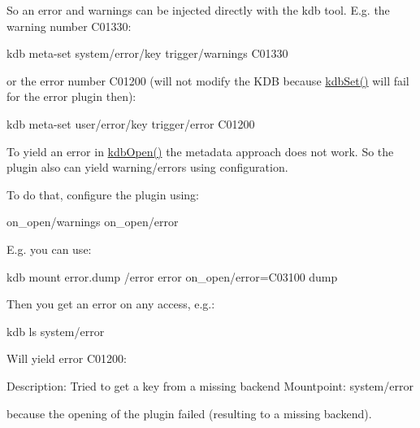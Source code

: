 So an error and warnings can be injected directly with the kdb tool. E.\+g. the warning number C01330\+:


\begin{DoxyCode}
kdb meta-set system/error/key trigger/warnings C01330
\end{DoxyCode}


or the error number C01200 (will not modify the K\+DB because {\ttfamily \hyperlink{group__kdb_ga11436b058408f83d303ca5e996832bcf}{kdb\+Set()}} will fail for the error plugin then)\+:


\begin{DoxyCode}
kdb meta-set user/error/key trigger/error C01200
\end{DoxyCode}


To yield an error in \hyperlink{group__kdb_ga6808defe5870f328dd17910aacbdc6ca}{kdb\+Open()} the metadata approach does not work. So the plugin also can yield warning/errors using configuration.

To do that, configure the plugin using\+:


\begin{DoxyCode}
on\_open/warnings
on\_open/error
\end{DoxyCode}


E.\+g. you can use\+:


\begin{DoxyCode}
kdb mount error.dump /error error on\_open/error=C03100 dump
\end{DoxyCode}


Then you get an error on any access, e.\+g.\+:


\begin{DoxyCode}
kdb ls system/error
\end{DoxyCode}


Will yield error C01200\+:


\begin{DoxyCode}
Description: Tried to get a key from a missing backend
Mountpoint: system/error
\end{DoxyCode}


because the opening of the plugin failed (resulting to a missing backend). 